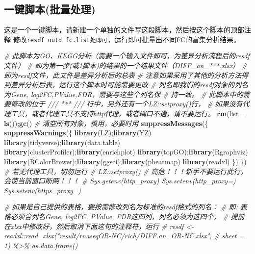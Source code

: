 \documentclass[
]{book}
\newenvironment{Shaded}{\begin{snugshade}}{\end{snugshade}}
\newcommand{\AttributeTok}[1]{\textcolor[rgb]{0.13,0.29,0.53}{#1}}
\newcommand{\CommentTok}[1]{\textcolor[rgb]{0.56,0.35,0.01}{\textit{#1}}}
\newcommand{\FunctionTok}[1]{\textcolor[rgb]{0.13,0.29,0.53}{\textbf{#1}}}
\newcommand{\NormalTok}[1]{#1}
\begin{document}
\subsection{一键脚本(批量处理)}\label{ux4e00ux952eux811aux672cux6279ux91cfux5904ux7406}

这是一个一键脚本，请新建一个单独的文件写这段脚本，然后按这个脚本的顶部注释
修改\texttt{resdf\ outd\ fc.list处即可}，运行即可批量出不同FC的富集分析结果。

\begin{Shaded}
\begin{Highlighting}[]
\CommentTok{\# 此脚本为GO、KEGG分析（需要一个输入文件即可，为差异分析流程后的resdf文件）}
\CommentTok{\# 即为第一步(或1脚本)的结果的一个结果文件（DIFF\_an\_***.xlsx）}
\CommentTok{\# 即为resdf文件，此文件是差异分析后的总表}
\CommentTok{\# 注意如果采用了其他的分析方法得到差异分析后表，运行这个脚本时可能需要更改}
\CommentTok{\# 列名即我们的resdf对象的列名为Gene, log2FC,PValue,FDR，需要与这些个列名保}
\CommentTok{\# 持一致。}
\CommentTok{\# 此脚本中的需要修改的位于 /// *** /// 行中，另外还有一个LZ::setproxy()行，}
\CommentTok{\#   如果没有代理工具，或者代理工具不支持http代理，或者端口不通，请不要运行。}
\FunctionTok{rm}\NormalTok{(}\AttributeTok{list =} \FunctionTok{ls}\NormalTok{());}\FunctionTok{gc}\NormalTok{() }\CommentTok{\# 清空所有对象，慎用，必要时用}
\FunctionTok{suppressMessages}\NormalTok{(\{ }\FunctionTok{suppressWarnings}\NormalTok{(\{}
  \FunctionTok{library}\NormalTok{(LZ);}\FunctionTok{library}\NormalTok{(YZ)}
  \FunctionTok{library}\NormalTok{(tidyverse);}\FunctionTok{library}\NormalTok{(data.table)}
  \FunctionTok{library}\NormalTok{(clusterProfiler);}\FunctionTok{library}\NormalTok{(enrichplot)}
  \FunctionTok{library}\NormalTok{(topGO);}\FunctionTok{library}\NormalTok{(Rgraphviz)}
  \FunctionTok{library}\NormalTok{(RColorBrewer);}\FunctionTok{library}\NormalTok{(ggsci);}\FunctionTok{library}\NormalTok{(pheatmap)}
  \FunctionTok{library}\NormalTok{(readxl)}
\NormalTok{\}) \})}
\CommentTok{\# 若无代理工具，切勿运行 }
\CommentTok{\# LZ::setproxy() \# 高危！！！新手不要运行此行，会使当前窗口断网！！！}
\CommentTok{\# Sys.getenv(\textquotesingle{}http\_proxy\textquotesingle{}) Sys.setenv(\textquotesingle{}http\_proxy\textquotesingle{}=\textquotesingle{}\textquotesingle{}) Sys.setenv(\textquotesingle{}https\_proxy\textquotesingle{}=\textquotesingle{}\textquotesingle{})}

\CommentTok{\# 如果是自己提供的表格，要按需修改列名为标准的resdf格式的列名：}
\CommentTok{\# 即: 表格必须含列名Gene, log2FC, PValue, FDR这四列，列名必须为这四个，}
\CommentTok{\# 提前在xlsx中修改好，然后取消下面这句的注释符，运行}
\CommentTok{\# resdf \textless{}{-} readxl::read\_xlsx("result/rnaseqOR{-}NC/rich/DIFF.an\_OR{-}NC.xlsx",}
\CommentTok{\#                  sheet = 1) \%\textgreater{}\% as.data.frame()}


\end{Highlighting}
\end{Shaded}
\end{document}
